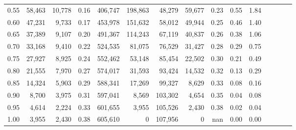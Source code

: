 \begin{tabular}{rrrcrrrrrrrrrrr}
0.55 &  58,463 &  10,778 &                                       0.16 &  406,747 &  198,863 &   48,279 &   59,677 &  0.23 &  0.55 &                         1.84 \\
0.60 &  47,231 &   9,733 &                                       0.17 &  453,978 &  151,632 &   58,012 &   49,944 &  0.25 &  0.46 &                         1.40 \\
0.65 &  37,389 &   9,107 &                                       0.20 &  491,367 &  114,243 &   67,119 &   40,837 &  0.26 &  0.38 &                         1.06 \\
0.70 &  33,168 &   9,410 &                                       0.22 &  524,535 &   81,075 &   76,529 &   31,427 &  0.28 &  0.29 &                         0.75 \\
0.75 &  27,927 &   8,925 &                                       0.24 &  552,462 &   53,148 &   85,454 &   22,502 &  0.30 &  0.21 &                         0.49 \\
0.80 &  21,555 &   7,970 &                                       0.27 &  574,017 &   31,593 &   93,424 &   14,532 &  0.32 &  0.13 &                         0.29 \\
0.85 &  14,324 &   5,903 &                                       0.29 &  588,341 &   17,269 &   99,327 &    8,629 &  0.33 &  0.08 &                         0.16 \\
0.90 &   8,700 &   3,975 &                                       0.31 &  597,041 &    8,569 &  103,302 &    4,654 &  0.35 &  0.04 &                         0.08 \\
0.95 &   4,614 &   2,224 &                                       0.33 &  601,655 &    3,955 &  105,526 &    2,430 &  0.38 &  0.02 &                         0.04 \\
1.00 &   3,955 &   2,430 &                                       0.38 &  605,610 &        0 &  107,956 &        0 &   nan &  0.00 &                         0.00 \\
\bottomrule
\end{tabular}
